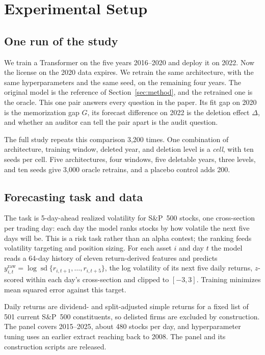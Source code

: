 \section{Experimental Setup}\label{sec:exp}

\subsection{One run of the study}

We train a Transformer on the five years 2016--2020 and deploy it on
2022. Now the license on the 2020 data expires. We retrain the same
architecture, with the same hyperparameters and the same seed, on the
remaining four years. The original model is the reference of Section~\ref{sec:method},
and the retrained one is the oracle. This one pair answers every
question in the paper. Its fit gap on 2020 is the memorization gap
$G$, its forecast difference on 2022 is the deletion effect
$\Delta$, and whether an auditor can tell the pair apart is the
audit question.

The full study repeats this comparison 3{,}200 times. One
combination of architecture, training window, deleted year, and
deletion level is a \emph{cell}, with ten seeds per cell. Five
architectures, four windows, five deletable years, three levels,
and ten seeds give 3{,}000 oracle retrains, and a placebo control
adds 200.

\subsection{Forecasting task and data}

The task is 5-day-ahead realized volatility for S\&P~500 stocks, one
cross-section per trading day: each day the model ranks stocks by how
volatile the next five days will be. This is a risk task rather than
an alpha contest; the ranking feeds volatility targeting and position
sizing. For each asset $i$ and day $t$ the model reads a 64-day
history of eleven return-derived features and predicts
$y^{\mathrm{raw}}_{i,t} = \log
\operatorname{sd}\{r_{i,t+1},\ldots,r_{i,t+5}\}$, the log
volatility of its next five daily returns, $z$-scored within each
day's cross-section and clipped to $[-3,3]$. Training minimizes
mean squared error against this target.

Daily returns are dividend- and split-adjusted simple returns for a
fixed list of 501 current S\&P~500 constituents, so delisted firms
are excluded by construction. The panel covers 2015--2025, about
480 stocks per day, and hyperparameter tuning uses an earlier
extract reaching back to 2008. The panel and its construction
scripts are released.

